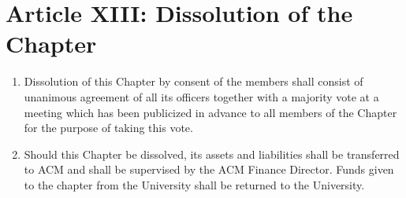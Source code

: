 \section*{Article XIII: Dissolution of the Chapter}
 
\begin{enumerate}
	\item Dissolution of this Chapter by consent of the members shall consist of unanimous agreement of all its officers together with a majority vote at a meeting which has been publicized in advance to all members of the Chapter for the purpose of taking this vote.
	\item Should this Chapter be dissolved, its assets and liabilities shall be transferred to ACM and shall be supervised by the ACM Finance Director. Funds given to the chapter from the University shall be returned to the University.
\end{enumerate}



